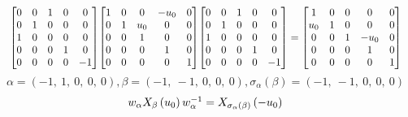\documentclass[11pt]{article}
\theoremstyle{definition}
\begin{document}
\[
\scaletoalign{\textwidth}{{\left[\begin{matrix}0 & 0 & 1 & 0 & 0\\0 & 1 & 0 & 0 & 0\\1 & 0 & 0 & 0 & 0\\0 & 0 & 0 & 1 & 0\\0 & 0 & 0 & 0 & -1\end{matrix}\right]} {\left[\begin{matrix}1 & 0 & 0 & - u_{0} & 0\\0 & 1 & u_{0} & 0 & 0\\0 & 0 & 1 & 0 & 0\\0 & 0 & 0 & 1 & 0\\0 & 0 & 0 & 0 & 1\end{matrix}\right]} {\left[\begin{matrix}0 & 0 & 1 & 0 & 0\\0 & 1 & 0 & 0 & 0\\1 & 0 & 0 & 0 & 0\\0 & 0 & 0 & 1 & 0\\0 & 0 & 0 & 0 & -1\end{matrix}\right]} = {\left[\begin{matrix}1 & 0 & 0 & 0 & 0\\u_{0} & 1 & 0 & 0 & 0\\0 & 0 & 1 & - u_{0} & 0\\0 & 0 & 0 & 1 & 0\\0 & 0 & 0 & 0 & 1\end{matrix}\right]}}
\]
\[
\alpha = \left( -1, \  1, \  0, \  0, \  0\right), \beta = \left( -1, \  -1, \  0, \  0, \  0\right), \sigma_{\alpha}(\beta) = \left( -1, \  -1, \  0, \  0, \  0\right)
\]
\[
\scaletoalign{\textwidth}{w_{\alpha} X_{\beta}\left(u_{0}\right) w_{\alpha}^{-1} = X_{\sigma_{\alpha}\left(\beta\right)}\left(- u_{0}\right)}
\]
\end{document}
